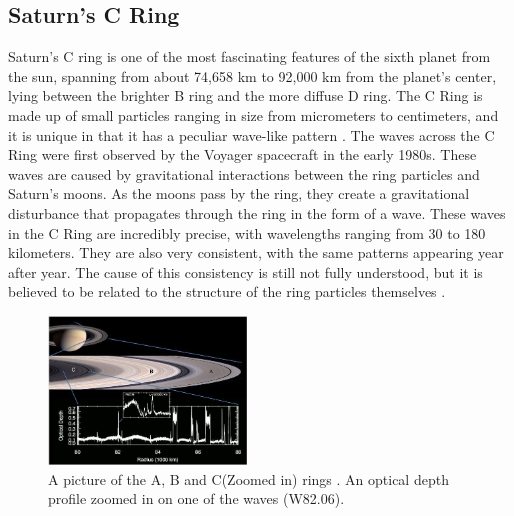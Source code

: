 \documentclass[conference]{IEEEtran}
\begin{document}
\subsection{Saturn’s C Ring}
Saturn's C ring is one of the most fascinating features of the sixth planet from the sun, spanning from about 74,658 km to 92,000 km from the planet's center, lying between the brighter B ring and the more diffuse D ring. The C Ring is made up of small particles ranging in size from micrometers to centimeters, and it is unique in that it has a peculiar wave-like pattern \cite{2009sfch.book..375C}\cite{Hedman_2018}\cite{Nicholson1990AnAR}. The waves across the C Ring were first observed by the Voyager spacecraft in the early 1980s. These waves are caused by gravitational interactions between the ring particles and Saturn's moons. As the moons pass by the ring, they create a gravitational disturbance that propagates through the ring in the form of a wave\cite{Hedman_2013}\cite{2014MNRAS.444.1369H}\cite{Hedman_2018}\cite{Marley1993PlanetaryAM}\cite{Nicholson1990AnAR}. These waves in the C Ring are incredibly precise, with wavelengths ranging from 30 to 180 kilometers. They are also very consistent, with the same patterns appearing year after year. The cause of this consistency is still not fully understood, but it is believed to be related to the structure of the ring particles themselves \cite{Hedman_2013}\cite{2014MNRAS.444.1369H}\cite{Hedman_2018}.

\begin{figure}[h] 
\centering
\includegraphics[width=0.47\textwidth]{Ring_Picture_Hedman_2018.jpg}
\caption{A picture of the A, B and C(Zoomed in) rings \cite{Hedman_2018}. An optical depth profile zoomed in on one of the waves (W82.06).} \label{fig:my_label}
\end{figure}
\end{document}
